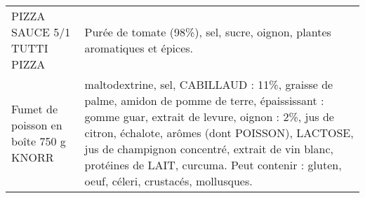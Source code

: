 \begin{longtable}{p{5cm}p{10cm}}
                                                                              PIZZA SAUCE 5/1 TUTTI PIZZA &                                                                                                                                                                                                                                                                                                                                                                                                                                                                                                                                                                                                                                                                                                                                                                                                                                                                                                                                                                Purée de tomate (98\%), sel, sucre, oignon, plantes aromatiques et épices. \\
                                                                    Fumet de poisson en boîte 750 g KNORR &                                                                                                                                                                                                                                                                                                                                                                                                                                                                                                                                                                                                                                                                                        maltodextrine, sel, CABILLAUD : 11\%, graisse de palme, amidon de pomme de terre, épaississant : gomme guar, extrait de levure, oignon : 2\%, jus de citron, échalote, arômes (dont POISSON), LACTOSE, jus de champignon concentré, extrait de vin blanc, protéines de LAIT, curcuma.  Peut contenir : gluten, oeuf, céleri, crustacés, mollusques. \\

\end{longtable}

